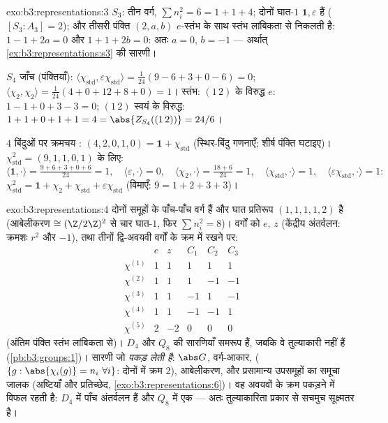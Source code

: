 \begin{solution}{exo:b3:representations:3}
$S_3$: तीन वर्ग, $\sum n_i^2 = 6 = 1 + 1 + 4$; दोनों घात-$1$  $\mathbf 1, \varepsilon$ हैं ($[S_3 :
A_3] = 2$); और तीसरी
पंक्ति $(2, a, b)$ $e$-स्तंभ के साथ स्तंभ लांबिकता से निकलती है: $1 - 1 + 2a = 0$ और
$1 + 1 +
2b = 0$: अतः $a = 0$, $b = -1$ --- अर्थात् \cref{ex:b3:representations:s3} की सारणी।

$S_4$ जाँच (पंक्तियाँ): $\langle\chi_{\mathrm{std}},
\varepsilon\chi_{\mathrm{std}}\rangle = \frac1{24}(9 - 6 + 3 + 0
- 6) = 0$; $\langle\chi_2,\chi_2\rangle = \frac1{24}(4 + 0 + 12
+ 8 + 0) = 1$। स्तंभ: $(1\,2)$ के विरुद्ध $e$:
$1 - 1 + 0 + 3 - 3
= 0$; $(1\,2)$ स्वयं के विरुद्ध: $1 + 1 + 0 + 1 + 1 = 4 =
\abs{Z_{S_4}((1\,2))} = 24/6$।

$4$ बिंदुओं पर क्रमचय : $(4, 2, 0, 1, 0) = \mathbf
1 + \chi_{\mathrm{std}}$ (स्थिर-बिंदु गणनाएँ; शीर्ष पंक्ति
घटाइए)। $\chi_{\mathrm{std}}^2 = (9, 1, 1, 0, 1)$ के लिए:
\[
\langle\mathbf1,\cdot\rangle = \tfrac{9 + 6 + 3 + 0 + 6}{24} =
1,\quad
\langle\varepsilon,\cdot\rangle = 0,\quad
\langle\chi_2,\cdot\rangle = \tfrac{18 + 6}{24} = 1,\quad
\langle\chi_{\mathrm{std}},\cdot\rangle = 1,\quad
\langle\varepsilon\chi_{\mathrm{std}},\cdot\rangle = 1:
\]
$\chi_{\mathrm{std}}^2 = \mathbf 1 + \chi_2 +
\chi_{\mathrm{std}} + \varepsilon\chi_{\mathrm{std}}$
(विमाएँ: $9 = 1 + 2 + 3 + 3$)।
\end{solution}

\begin{solution}{exo:b3:representations:4}
दोनों समूहों के पाँच-पाँच वर्ग हैं और घात प्रतिरूप $(1,1,1,1,2)$ है (आबेलीकरण
$\cong (\Z/2\Z)^2$ से चार घात-$1$, फिर $\sum n_i^2 = 8$)। वर्गों को $e$, $z$ (केंद्रीय
अंतर्वलन: क्रमशः $r^2$ और $-1$), तथा तीनों द्वि-अवयवी वर्गों के क्रम
में रखने पर:
\[
\begin{array}{c|ccccc}
& e & z & C_1 & C_2 & C_3\\
\hline
\chi^{(1)} & 1 & 1 & 1 & 1 & 1\\
\chi^{(2)} & 1 & 1 & 1 & -1 & -1\\
\chi^{(3)} & 1 & 1 & -1 & 1 & -1\\
\chi^{(4)} & 1 & 1 & -1 & -1 & 1\\
\chi^{(5)} & 2 & -2 & 0 & 0 & 0
\end{array}
\]
(अंतिम पंक्ति स्तंभ लांबिकता से)। $D_4$ और $Q_8$ की सारणियाँ समरूप
हैं, जबकि वे तुल्याकारी नहीं हैं (\cref{pb:b3:groups:1})। सारणी जो \emph{पकड़ लेती
है}: $\abs
G$, वर्ग-आकार,  ($\{g : \abs{\chi_i(g)} = n_i\
\forall i\}$: दोनों में क्रम $2$), आबेलीकरण,
और प्रसामान्य उपसमूहों का समूचा जालक (अष्टियाँ और प्रतिच्छेद, \cref{exo:b3:representations:6})।
वह अवयवों के क्रम पकड़ने में विफल रहती है: $D_4$ में पाँच अंतर्वलन
हैं और $Q_8$ में एक --- अतः तुल्याकारिता प्रकार  से सचमुच
सूक्ष्मतर है।
\end{solution}

